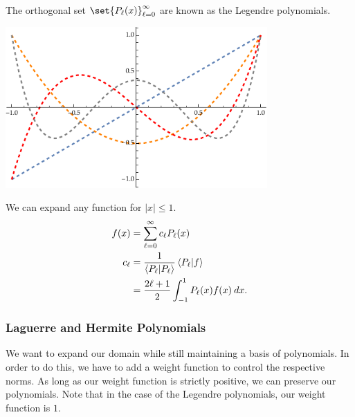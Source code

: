 \documentclass[10pt]{mypackage}
\begin{document}
The orthogonal set $\set{P_{\ell}(x)}_{\ell=0}^{\infty}$ are known as the Legendre polynomials. 
\begin{center}
  \includegraphics[width=10cm]{images/legendre_polynomials.pdf}
\end{center}
We can expand any function for $|x| \leq 1$.
\begin{align*}
  f(x) &= \sum_{\ell=0}^{\infty}c_{\ell}P_{\ell}(x)\\
  c_{\ell} &= \frac{1}{\braket{P_{\ell}}{P_{\ell}}} \braket{P_{\ell}}{f}\\
           &= \frac{2\ell + 1}{2} \int_{-1}^{1} P_{\ell}(x)f(x)\:dx.
\end{align*}
\subsubsection{Laguerre and Hermite Polynomials}%
We want to expand our domain while still maintaining a basis of polynomials. In order to do this, we have to add a weight function to control the respective norms. As long as our weight function is strictly positive, we can preserve our polynomials. Note that in the case of the Legendre polynomials, our weight function is $1$.\newline
\end{document}
